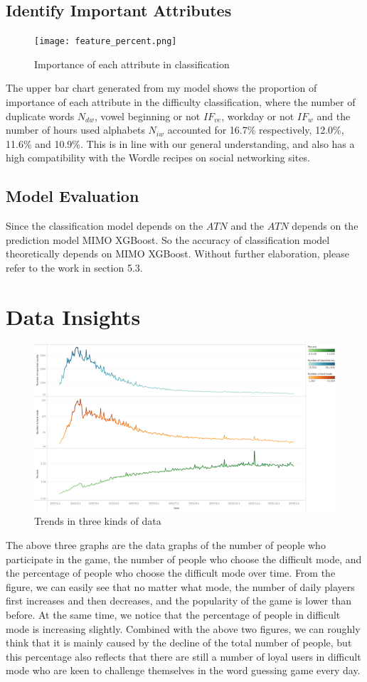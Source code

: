 \documentclass[12pt]{article}  %
\begin{document}
\subsection{Identify Important Attributes}
\begin{figure}
    \centering
    \texttt{[image: feature\_percent.png]}
    \caption{Importance of each attribute in classification}\label{fig:feature_percent}
\end{figure}
The upper bar chart generated from my model shows the proportion of importance of each attribute in the difficulty classification, where the number of duplicate words $N_{dw}$, vowel beginning or not $IF_{ve}$, workday or not $IF_w$ and the number of hours used alphabets $N_{iw}$ accounted for 16.7\% respectively, 12.0\%, 11.6\% and 10.9\%. This is in line with our general understanding, and also has a high compatibility with the Wordle recipes on social networking sites.

\subsection{Model Evaluation}
Since the classification model depends on the $ATN$ and the $ATN$ depends on the prediction model MIMO XGBoost. So the accuracy of classification model theoretically depends on MIMO XGBoost. Without further elaboration, please refer to the work in section 5.3.




\section{Data Insights}


\begin{figure}[htbp]
\centering
\includegraphics[width=.5\textwidth]{img/insight1.png}
\caption{Trends in three kinds of data}\label{fig:insight1}
\end{figure}
The above three graphs are the data graphs of the number of people who participate in the game, the number of people who choose the difficult mode, and the percentage of people who choose the difficult mode over time. From the figure, we can easily see that no matter what mode, the number of daily players first increases and then decreases, and the popularity of the game is lower than before. At the same time, we notice that the percentage of people in difficult mode is increasing slightly. Combined with the above two figures, we can roughly think that it is mainly caused by the decline of the total number of people, but this percentage also reflects that there are still a number of loyal users in difficult mode who are keen to challenge themselves in the word guessing game every day.
\end{document}
